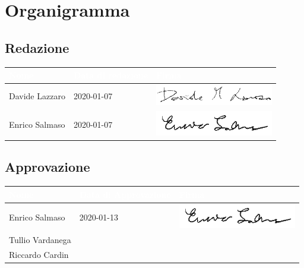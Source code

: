 \section{Organigramma}
\subsection{Redazione}
{
	\renewcommand{\arraystretch}{2}
	\begin{longtable}{ C{5cm} C{4cm} C{5cm} }
		\textcolor{white}{\textbf{Nome}} & \textcolor{white}{\textbf{Data di redazione}} & \textcolor{white}{\textbf{Firma}}\\	\endhead
        
        Davide Lazzaro & 2020-01-07 &
        \includegraphics[scale=0.60]{sezioni/Firme/Davide.png}  \\
        Enrico Salmaso & 2020-01-07 &
        \includegraphics[scale=0.70]{sezioni/Firme/Enrico.png}  \\
        		
	\end{longtable}
}

\subsection{Approvazione}
{
	\renewcommand{\arraystretch}{2}
	\centering
	\begin{longtable}{ C{5cm} C{4cm} C{5cm} }
		\textcolor{white}{\textbf{Nome}} & \textcolor{white}{\textbf{Data di Approvazione}} & \textcolor{white}{\textbf{Firma}}\\	\endhead
		
		
		Enrico Salmaso & 2020-01-13 &  
		\includegraphics[scale=0.70]{sezioni/Firme/Enrico.png}\\
		Tullio Vardanega &  & \\
		Riccardo Cardin & &  \\
		
	\end{longtable}
}

